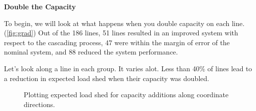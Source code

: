 \textbf{Double the Capacity}

To begin, we will look at what happens when you double capacity on each line.  (\ref{fig:grad})  Out of the 186 lines, 51 lines resulted in an improved system with respect to the cascading process, 47 were within the margin of error of the nominal system, and 88 reduced the system performance.


\begin{figure}

\end{figure}

Let's look along a line in each group.  It varies alot.  Less than 40\% of lines lead to a reduction in expected load shed when their capacity was doubled.


\begin{figure}

	\caption{Plotting expected load shed for capacity additions along coordinate directions.  }
\end{figure}
